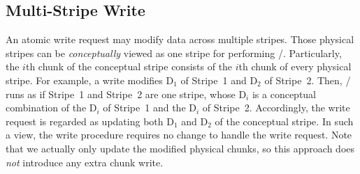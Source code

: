 \vspace{-1em}
\subsection{Multi-Stripe Write}
\vspace{-0.5em}

An atomic write request may modify data across multiple stripes. Those physical
stripes can be \emph{conceptually} viewed as one stripe for performing
\protocol/. Particularly, the $i$th chunk of the conceptual stripe consists of
the $i$th chunk of every physical stripe. For example, a write modifies D$_1$
of Stripe~1 and D$_2$ of Stripe~2. Then, \protocol/ runs as if Stripe~1 and
Stripe~2 are one stripe, whose D$_i$ is a conceptual combination of the D$_i$
of Stripe~1 and the D$_i$ of Stripe~2. Accordingly, the write request is
regarded as updating both D$_1$ and D$_2$ of the conceptual stripe. In such a
view, the write procedure requires no change to handle the write request.
Note that we actually only update the modified physical chunks, so this
approach does \emph{not} introduce any extra chunk write.


%

\vspace{-1em}
